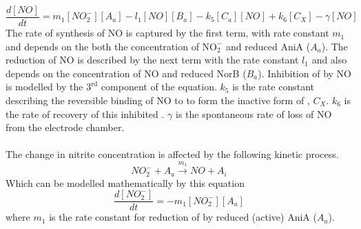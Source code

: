 \begin{equation}
\frac{d[NO]}{dt} = m_{1}[NO_2^-][A_a] - l_1[NO][B_a] - k_5[C_a][NO] + k_6 [C_X] - \gamma[NO]
\label{eq:no}
\end{equation}
The rate of synthesis of NO is captured by the first term, with rate constant $m_{1}$ and depends on the both the concentration of $\mathrm{NO}_\mathrm{2}^\mathrm{-}$ and reduced AniA ($A_a$). The reduction of NO is described by the next term with the rate constant $l_1$ and also depends on the concentration of NO and reduced NorB ($B_a$). Inhibition of \cbbthree{} by NO is modelled by the $\mathrm{3}^\mathrm{rd}$ component of the equation. $k_5$ is the rate constant describing the reversible binding of NO to \cbbthree{} to form the inactive form of \cbbthree{}, $C_X$. $k_6$ is the rate of recovery of this inhibited \cbbthree{}. $\gamma$ is the spontaneous rate of loss of NO from the electrode chamber.\\
\clearpage
{}\\
The change in nitrite concentration is affected by the following kinetic process.
\begin{equation*}
NO_2^- + A_a \xrightarrow{m_1} NO + A_i
\end{equation*}
Which can be modelled mathematically by this equation
\begin{equation}
\frac{d[NO_2^-]}{dt} = - m_{1}[NO_2^-][A_a]
\label{eq:nitrite}
\end{equation}
where $m_{1}$ is the rate constant for reduction of \cNitrite{} by reduced (active) AniA ($A_a$).

